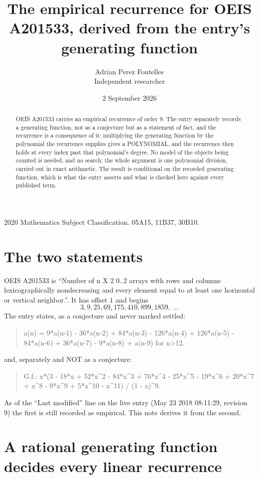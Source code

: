 \documentclass[11pt,a4paper]{article}
\title{The empirical recurrence for OEIS A201533, derived from the entry's generating function}
\author{Adrian Perez Fontelles\\ \small Independent researcher}
\date{2 September 2026}
\theoremstyle{plain}
\theoremstyle{definition}
\begin{document}
\maketitle

\begin{abstract}
OEIS A201533 carries an empirical recurrence of order $9$. The entry separately records a
generating function, not as a conjecture but as a statement of fact, and the recurrence is a
consequence of it: multiplying the generating function by the polynomial the recurrence
supplies gives a POLYNOMIAL, and the recurrence then holds at every index past that
polynomial's degree. No model of the objects being counted is needed, and no search: the
whole argument is one polynomial division, carried out in exact arithmetic. The result is
conditional on the recorded generating function, which is what the entry asserts and what is
checked here against every published term.
\end{abstract}

\noindent\small 2020 Mathematics Subject Classification. 05A15, 11B37, 30B10.\normalsize

\section{The two statements}

OEIS A201533 is ``Number of n X 2 0..2 arrays with rows and columns lexicographically nondecreasing and every element equal to at least one horizontal or vertical neighbor.''. It has offset $1$ and begins
\[
3, 9, 25, 69, 175, 410, 899, 1859,\ \dots
\]
The entry states, as a conjecture and never marked settled:
\begin{quote}
a(n) = 9*a(n-1) - 36*a(n-2) + 84*a(n-3) - 126*a(n-4) + 126*a(n-5) - 84*a(n-6) + 36*a(n-7) - 9*a(n-8) + a(n-9) for n>12.
\end{quote}
and, separately and NOT as a conjecture:
\begin{quote}
G.f.: x*(3 - 18*x + 52*x\^{}2 - 84*x\^{}3 + 76*x\^{}4 - 25*x\^{}5 - 19*x\^{}6 + 20*x\^{}7 + x\^{}8 - 9*x\^{}9 + 5*x\^{}10 - x\^{}11) / (1 - x)\^{}9.
\end{quote}
As of the ``Last modified'' line on the live entry (May 23 2018 08:11:29, revision 9) the first is still
recorded as empirical. This note derives it from the second.

\section{A rational generating function decides every linear recurrence}
\end{document}

